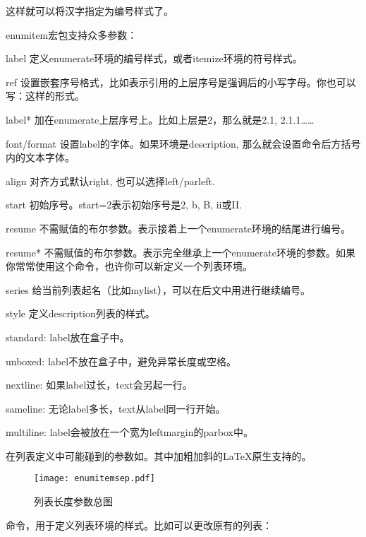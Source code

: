 这样就可以将汉字指定为编号样式了。

enumitem宏包支持众多参数：
\begin{para}
\item[label] 定义enumerate环境的编号样式，或者itemize环境的符号样式。
\item[ref] 设置嵌套序号格式，比如\latexline{[ref=\\emph{\\alph*}]}表示引用的上层序号是强调后的小写字母。你也可以写：\latexline{[label=\alph{enumi}. \roman*]}这样的形式。
\item[label*] 加在enumerate上层序号上。比如上层是2，那么就是2.1, 2.1.1……
\item[font/format] 设置label的字体。如果环境是description, 那么就会设置\latexline{\\item}命令后方括号内的文本字体。
\item[align] 对齐方式默认right, 也可以选择left/parleft.
\item[start] 初始序号。start=2表示初始序号是2, b, B, ii或II.
\item[resume] 不需赋值的布尔参数。表示接着上一个enumerate环境的结尾进行编号。
\item[resume*] 不需赋值的布尔参数。表示完全继承上一个enumerate环境的参数。如果你常常使用这个命令，也许你可以新定义一个列表环境。
\item[series] 给当前列表起名（比如mylist），可以在后文中用进行继续编号。
\item[style] 定义description列表的样式。
\begin{para}
\item[standard:] label放在盒子中。
\item[unboxed:] label不放在盒子中，避免异常长度或空格。
\item[nextline:] 如果label过长，text会另起一行。
\item[sameline:] 无论label多长，text从label同一行开始。
\item[multiline:] label会被放在一个宽为leftmargin的parbox中。
\end{para}
\end{para}

在列表定义中可能碰到的参数如。其中加粗加斜的\LaTeX 原生支持的。
\begin{figure}[!hbt]
\texttt{[image: enumitemsep.pdf]}
\caption{列表长度参数总图}
\label{fig:enumitemsep}
\end{figure}

命令\latexline{\\setlist}，用于定义列表环境的样式。比如可以更改原有的列表：
\begin{latex}{}
\end{latex}

